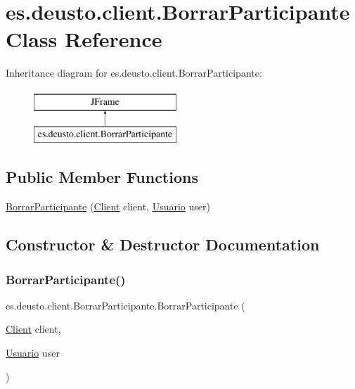 \hypertarget{classes_1_1deusto_1_1client_1_1_borrar_participante}{}\section{es.\+deusto.\+client.\+Borrar\+Participante Class Reference}
\label{classes_1_1deusto_1_1client_1_1_borrar_participante}
Inheritance diagram for es.\+deusto.\+client.\+Borrar\+Participante\+:\begin{figure}[H]
\begin{center}
\leavevmode
\includegraphics[height=2.000000cm]{classes_1_1deusto_1_1client_1_1_borrar_participante}
\end{center}
\end{figure}
\subsection*{Public Member Functions}
\begin{DoxyCompactItemize}
\item 
\mbox{\hyperlink{classes_1_1deusto_1_1client_1_1_borrar_participante_a97c9431ed8d323618d8e34078d3a7955}{Borrar\+Participante}} (\mbox{\hyperlink{classes_1_1deusto_1_1client_1_1_client}{Client}} client, \mbox{\hyperlink{classes_1_1deusto_1_1server_1_1jdo_1_1_usuario}{Usuario}} user)
\end{DoxyCompactItemize}


\subsection{Constructor \& Destructor Documentation}
\mbox{\label{classes_1_1deusto_1_1client_1_1_borrar_participante_a97c9431ed8d323618d8e34078d3a7955}} 
\subsubsection{\texorpdfstring{BorrarParticipante()}{BorrarParticipante()}}
{\footnotesize\ttfamily es.\+deusto.\+client.\+Borrar\+Participante.\+Borrar\+Participante (\begin{DoxyParamCaption}\item[{\mbox{\hyperlink{classes_1_1deusto_1_1client_1_1_client}{Client}}}]{client,  }\item[{\mbox{\hyperlink{classes_1_1deusto_1_1server_1_1jdo_1_1_usuario}{Usuario}}}]{user }\end{DoxyParamCaption})}

